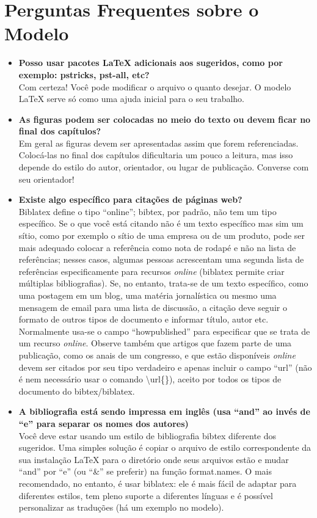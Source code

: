 \section{Perguntas Frequentes sobre o Modelo}

\begin{itemize}

\item \textbf{Posso usar pacotes \LaTeX{} adicionais aos sugeridos, como por exemplo: pstricks, pst-all, etc?}\\
Com certeza! Você pode modificar o arquivo o quanto desejar. O modelo \LaTeX{} serve só como uma ajuda inicial para o seu trabalho.

\item \textbf{As figuras podem ser colocadas no meio do texto ou devem ficar no final dos capítulos?}\\
Em geral as figuras devem ser apresentadas assim que forem referenciadas. Colocá-las no final dos capítulos dificultaria um pouco a leitura, mas isso depende do estilo do autor, orientador, ou lugar de publicação. Converse com seu orientador!

\item \textbf{Existe algo específico para citações de páginas web?}\\
Biblatex define o tipo ``online''; bibtex, por padrão, não tem um tipo específico. Se o que você está citando não é um texto específico mas sim um sítio, como por exemplo o sítio de uma empresa ou de um produto, pode ser mais adequado colocar a referência como nota de rodapé e não na lista de referências; nesses casos, algumas pessoas acrescentam uma segunda lista de referências especificamente para recursos \emph{online} (biblatex  permite criar múltiplas bibliografias). Se, no entanto, trata-se de um texto específico, como uma postagem em um blog, uma matéria jornalística ou mesmo uma mensagem de email para uma lista de discussão, a citação deve seguir o formato de outros tipos de documento e informar título, autor etc. Normalmente usa-se o campo ``howpublished'' para especificar que se trata de um recurso \emph{online}. Observe também que artigos que fazem parte de uma publicação, como os anais de um congresso, e que estão disponíveis \emph{online} devem ser citados por seu tipo verdadeiro e apenas incluir o campo ``url'' (não é nem necessário usar o comando \textsf{\textbackslash{}url\{\}}), aceito por todos os tipos de documento do bibtex/biblatex.

\item \textbf{A bibliografia está sendo impressa em inglês (usa ``and'' ao invés de ``e'' para separar os nomes dos autores)}\\
Você deve estar usando um estilo de bibliografia bibtex diferente dos sugeridos. Uma simples solução é copiar o arquivo de estilo correspondente da sua instalação \LaTeX{} para o diretório onde seus arquivos estão e mudar ``and'' por ``e'' (ou ``\&'' se preferir) na função format.names. O mais recomendado, no entanto, é usar biblatex: ele é mais fácil de adaptar para diferentes estilos, tem pleno suporte a diferentes línguas e é possível personalizar as traduções (há um exemplo no modelo).


\end{itemize}
